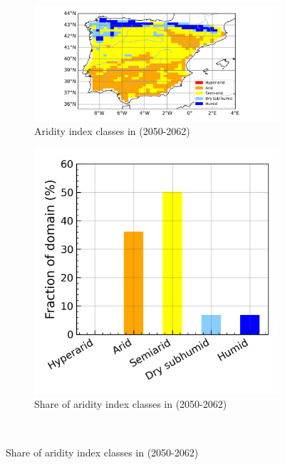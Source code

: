\begin{figure}[htbp]
    \begin{subfigure}[b]{0.67\textwidth}
        \caption{Aridity index classes in \futnoirr (2050-2062)}
        \includegraphics[width=\textwidth]{images/chap4/future/aridity_index_fut_noirr.png}
    \end{subfigure}
    \begin{subfigure}[b]{0.31\textwidth}
        \caption{Share of aridity index classes in \futnoirr (2050-2062)}
        \includegraphics[width=\textwidth]{images/chap4/future/aridity_index_distribution_fut_noirr.png}
    \end{subfigure} \\


\end{figure}

